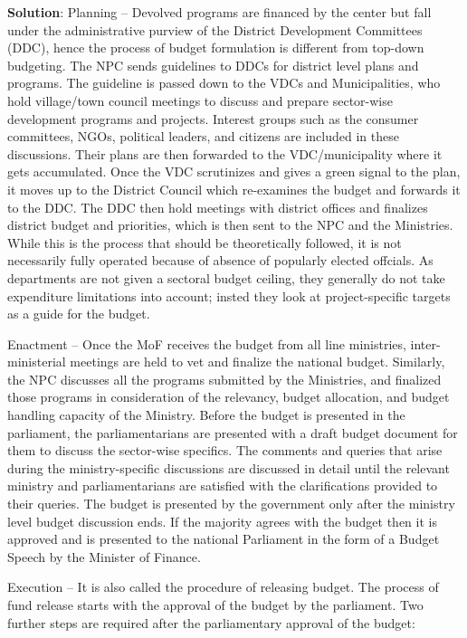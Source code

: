 \documentclass[
  openany]{book}
\newenvironment{solution}{ {\bfseries Solution}:}{}
\begin{document}
\begin{questions}
\begin{solution}
Planning -- Devolved programs are financed by the center but fall under the administrative purview of the District Development Committees (DDC), hence the process of budget formulation is different from top-down budgeting. The NPC sends guidelines to DDCs for district level plans and programs. The guideline is passed down to the VDCs and Municipalities, who hold village/town council meetings to discuss and prepare sector-wise development programs and projects. Interest groups such as the consumer committees, NGOs, political leaders, and citizens are included in these discussions. Their plans are then forwarded to the VDC/municipality where it gets accumulated. Once the VDC scrutinizes and gives a green signal to the plan, it moves up to the District Council which re-examines the budget and forwards it to the DDC. The DDC then hold meetings with district offices and finalizes district budget and priorities, which is then sent to the NPC and the Ministries. While this is the process that should be theoretically followed, it is not necessarily fully operated because of absence of popularly elected offcials. As departments are not given a sectoral budget ceiling, they generally do not take expenditure limitations into account; insted they look at project-specific targets as a guide for the budget.

Enactment -- Once the MoF receives the budget from all line ministries, inter-ministerial meetings are held to vet and finalize the national budget. Similarly, the NPC discusses all the programs submitted by the Ministries, and finalized those programs in consideration of the relevancy, budget allocation, and budget handling capacity of the Ministry. Before the budget is presented in the parliament, the parliamentarians are presented with a draft budget document for them to discuss the sector-wise specifics. The comments and queries that arise during the ministry-specific discussions are discussed in detail until the relevant ministry and parliamentarians are satisfied with the clarifications provided to their queries. The budget is presented by the government only after the ministry level budget discussion ends. If the majority agrees with the budget then it is approved and is presented to the national Parliament in the form of a Budget Speech by the Minister of Finance.

Execution -- It is also called the procedure of releasing budget. The process of fund release starts with the approval of the budget by the parliament. Two further steps are required after the parliamentary approval of the budget:


\end{solution}
\end{questions}
\end{document}
